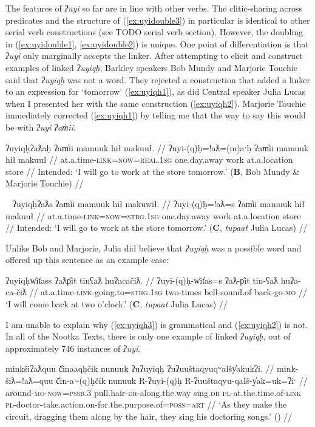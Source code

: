 The features of \textit{ʔuyi} so far are in line with other verbs. The clitic-sharing across predicates and the structure of (\ref{ex:uyidouble3}) in particular is identical to other serial verb constructions (see TODO serial verb section). However, the doubling in (\ref{ex:uyidouble1}, \ref{ex:uyidouble2}) is unique. One point of differentiation is that \textit{ʔuyi} only marginally accepts the linker. After attempting to elicit and construct examples of linked \textit{ʔuyiqḥ}, Barkley speakers Bob Mundy and Marjorie Touchie said that \textit{ʔuyiqḥ} was not a word. They rejected a construction that added a linker to an expression for `tomorrow' (\ref{ex:uyiqh1}), as did Central speaker Julia Lucas when I presented her with the same construction (\ref{ex:uyiqh2}). Marjorie Touchie immediately corrected (\ref{ex:uyiqh1}) by telling me that the way to say this would be with \textit{ʔuyi ʔam̓ii}.

\ex \label{ex:uyiqh1}
\begingl
\glpreamble *ʔuyiqḥʔaƛaḥ ʔam̓ii mamuuk hił makuuł. //
\gla ʔuyi-(q)ḥ=!aƛ=(m)aˑḥ ʔam̓ii mamuuk hił makuuł //
\glb at.a.time-\textsc{link}=\textsc{now}=\textsc{real.1sg} one.day.away work at.a.location store //
\glft Intended: `I will go to work at the store tomorrow.' (\textbf{B}, Bob Mundy \& Marjorie Touchie) //
\endgl
\xe

\ex~ \label{ex:uyiqh2}
\begingl
\glpreamble *ʔuyiqḥʔaƛs ʔam̓ii mamuuk hił makuwił. //
\gla ʔuyi-(q)ḥ=!aƛ=s ʔam̓ii mamuuk hił makuuł //
\glb at.a.time-\textsc{link}=\textsc{now}=\textsc{strg.1sg} one.day.away work at.a.location store //
\glft Intended: `I will go to work at the store tomorrow.' (\textbf{C}, \textit{tupaat} Julia Lucas) //
\endgl
\xe

Unlike Bob and Marjorie, Julia did believe that \textit{ʔuyiqḥ} was a possible word and offered up this sentence as an example case:

\ex \label{ex:uyiqh3}
\begingl
\glpreamble ʔuyiqḥw̓it̓ass ʔaƛp̓it tinʕaƛ huʔacačiƛ. //
\gla ʔuyi-(q)ḥ-w̓it̓as=s ʔaƛ-p̓it tin-ʕaƛ huʔa-ca-čiƛ //
\glb at.a.time-\textsc{link}-going.to=\textsc{strg.1sg} two-times bell-sound.of back-go-\textsc{mo} //
\glft `I will come back at two o'clock.' (\textbf{C}, \textit{tupaat} Julia Lucas) //
\endgl
\xe

I am unable to explain why (\ref{ex:uyiqh3}) is grammatical and (\ref{ex:uyiqh2}) is not. In all of the Nootka Texts, there is only one example of linked \textit{ʔuyiqḥ}, out of approximately 746 instances of \textit{ʔuyi}.

\ex \label{ex:uyiqh4}
\begingl
\glpreamble minkšiʔaƛquu č̓inaaqḥčik nunuuk ʔuʔuyiqḥ ʔuʔuuštaqyuqʷałšy̓akukʔi. //
\gla mink-šiƛ=!aƛ=quu č̓in-aˑ-(q)ḥčik nunuuk R-ʔuyi-(q)ḥ R-ʔuuštaqyu-qałš-y̓ak=uk=ʔiˑ //
\glb around-\textsc{mo}-\textsc{now}=\textsc{pssb.3} pull.hair-\textsc{dr}-along.the.way sing.\textsc{dr} \textsc{pl}-at.the.time.of-\textsc{link} \textsc{pl}-doctor-take.action.on-for.the.purpose.of=\textsc{poss}=\textsc{art} //
\glft `As they make the circuit, dragging them along by the hair, they sing his doctoring songs.' (\citealt[105]{sapir1939}) //
\endgl
\xe

